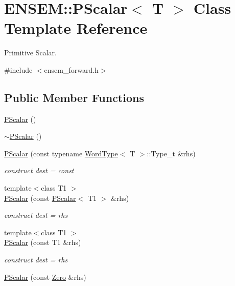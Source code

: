 \hypertarget{classENSEM_1_1PScalar}{}\section{E\+N\+S\+EM\+:\+:P\+Scalar$<$ T $>$ Class Template Reference}
\label{classENSEM_1_1PScalar}


Primitive Scalar.  




{\ttfamily \#include $<$ensem\+\_\+forward.\+h$>$}

\subsection*{Public Member Functions}
\begin{DoxyCompactItemize}
\item 
\mbox{\hyperlink{classENSEM_1_1PScalar_a0f70e3ea4cc0d0f1753a2ed87ecf2e04}{P\+Scalar}} ()
\item 
\mbox{\hyperlink{classENSEM_1_1PScalar_a136d4a70f16eadecdf840f4e9d4b1b7c}{$\sim$\+P\+Scalar}} ()
\item 
\mbox{\hyperlink{classENSEM_1_1PScalar_aeb51f7fd0a7c5d9b7465ceabdb9311f8}{P\+Scalar}} (const typename \mbox{\hyperlink{structENSEM_1_1WordType}{Word\+Type}}$<$ T $>$\+::Type\+\_\+t \&rhs)
\begin{DoxyCompactList}\small\item\em construct dest = const \end{DoxyCompactList}\item 
{\footnotesize template$<$class T1 $>$ }\\\mbox{\hyperlink{classENSEM_1_1PScalar_a5dad766fb1a59a9e23d03b31f22916bb}{P\+Scalar}} (const \mbox{\hyperlink{classENSEM_1_1PScalar}{P\+Scalar}}$<$ T1 $>$ \&rhs)
\begin{DoxyCompactList}\small\item\em construct dest = rhs \end{DoxyCompactList}\item 
{\footnotesize template$<$class T1 $>$ }\\\mbox{\hyperlink{classENSEM_1_1PScalar_a99cdd295d67d2d32aa481a4a8d9dcc1b}{P\+Scalar}} (const T1 \&rhs)
\begin{DoxyCompactList}\small\item\em construct dest = rhs \end{DoxyCompactList}\item 
\mbox{\hyperlink{classENSEM_1_1PScalar_a9d7f56a0caeb05ee423b451d2f3aae3b}{P\+Scalar}} (const \mbox{\hyperlink{structENSEM_1_1Zero}{Zero}} \&rhs)

\end{DoxyCompactItemize}
